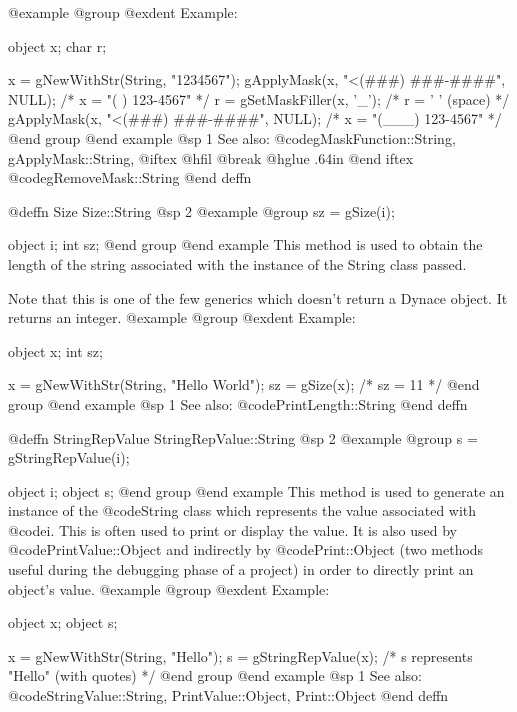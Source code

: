 @example
@group
@exdent Example:

object  x;
char    r;

x = gNewWithStr(String, "1234567");
gApplyMask(x, "<(###) ###-####", NULL);
      /* x = "(   ) 123-4567" */
r = gSetMaskFiller(x, '_');
      /* r = ' ' (space)      */
gApplyMask(x, "<(###) ###-####", NULL);
      /* x = "(___) 123-4567" */
@end group
@end example
@sp 1
See also:  @code{gMaskFunction::String, gApplyMask::String,}
@iftex
@hfil @break @hglue .64in      
@end iftex
@code{gRemoveMask::String}
@end deffn












@deffn {Size} Size::String
@sp 2
@example
@group
sz = gSize(i);

object  i;
int     sz;
@end group
@end example
This method is used to obtain the length of the string associated with
the instance of the String class passed.

Note that this is one of the few generics which doesn't return a Dynace
object.  It returns an integer.
@example
@group
@exdent Example:

object  x;
int     sz;

x = gNewWithStr(String, "Hello World");
sz = gSize(x);
/*  sz = 11   */
@end group
@end example
@sp 1
See also:  @code{PrintLength::String}
@end deffn










@deffn {StringRepValue} StringRepValue::String
@sp 2
@example
@group
s = gStringRepValue(i);

object  i;
object  s;
@end group
@end example
This method is used to generate an instance of the @code{String} class
which represents the value associated with @code{i}.  This is often
used to print or display the value.  It is also used by
@code{PrintValue::Object} and indirectly by @code{Print::Object}
(two methods useful during the debugging phase of a project)
in order to directly print an object's value.
@example
@group
@exdent Example:

object  x;
object  s;

x = gNewWithStr(String, "Hello");
s = gStringRepValue(x);
  /* s represents "Hello" (with quotes)  */
@end group
@end example
@sp 1
See also:  @code{StringValue::String, PrintValue::Object, Print::Object}
@end deffn











